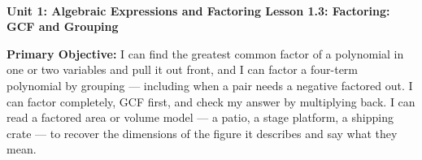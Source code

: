 \documentclass[10pt]{article}
\newcommand{\UnitNumberName}{Unit 1: Algebraic Expressions and Factoring \quad}
\newcommand{\LessonNumberName}{Lesson 1.3: Factoring: GCF and Grouping}
\begin{document}
\begin{center}
    {\Large\bfseries \CourseName \\
    {\small\bfseries \UnitNumberName \LessonNumberName}}
\end{center}

\begin{tcolorbox}[colback=mist, colframe=royal, boxrule=0.9pt, arc=2mm,
    left=2mm, right=2mm, top=1.5mm, bottom=1.5mm]
    \textbf{Primary Objective:} I can find the greatest common factor of a polynomial in one or two
    variables and pull it out front, and I can factor a four-term polynomial by grouping ---
    including when a pair needs a negative factored out. I can factor completely, GCF first, and
    check my answer by multiplying back. I can read a factored area or volume model --- a patio, a
    stage platform, a shipping crate --- to recover the dimensions of the figure it describes and
    say what they mean.
\end{tcolorbox}
\end{document}
